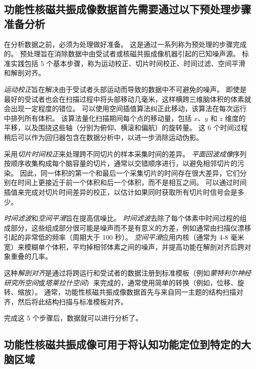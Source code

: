 


\subsection{功能性核磁共振成像数据首先需要通过以下预处理步骤准备分析}

在分析数据之前，必须为处理做好准备。 
这是通过一系列称为预处理的步骤完成的。 
预处理旨在消除数据中由受试者或核磁共振成像机器引起的已知噪声源。 
标准实践包括 5 个基本步骤，称为运动校正、切片时间校正、时间过滤、空间平滑和解剖对齐。


\textit{运动校正}旨在解决由于受试者头部运动而导致的数据中不可避免的噪声。
即使是最好的受试者也会在扫描过程中将头部移动几毫米，这样横跨三维脑体积的体素就会出现一定程度的错位。
可以使用空间插值算法纠正此移动，该算法在每次运行中排列所有体积。
该算法量化扫描期间每个点的移动量，包括 $x$、$y$ 和 $z$ 维度的平移，以及围绕这些轴（分别为俯仰、横滚和偏航）的旋转量。
这 6 个时间过程稍后可以作为回归器包含在数据分析中，以进一步消除运动伪影。


采用\textit{切片时间校正}来处理跨不同切片的样本采集时间的差异。
\textit{平面回波成像}序列按顺序收集构成每个脑容量的切片，通常以交错顺序进行，以避免相邻切片的污染。
因此，同一体积的第一个和最后一个采集切片的时间存在很大差异，它们分别在时间上更接近于前一个体积和后一个体积，而不是相互之间。
可以通过时间插值来完成对切片时间差异的校正，以估计如果同时获取所有切片时信号会是多少。


\textit{时间滤波}和\textit{空间平滑}旨在提高信噪比。
\textit{时间滤波}去除了每个体素中时间过程的组成部分，这些组成部分很可能是噪声而不是有意义的方差，例如通常由扫描仪漂移引起的非常低的频率（周期大于 100 秒）。
\textit{空间平滑}应用内核（通常为 4-8 毫米宽）来模糊单个体积，平均掉相邻体素之间的噪声，并提高功能在解剖对齐后跨对象重叠的几率。


这种\textit{解剖对齐}是通过将跨运行和受试者的数据注册到标准模板（例如\textit{蒙特利尔神经研究所空间}或\textit{塔莱拉什空间}）来完成的，通常使用简单的转换（例如，位移、旋转、缩放）。
通常，功能性核磁共振成像数据首先与来自同一主题的结构扫描对齐，然后将此结构扫描与标准模板对齐。


完成这 5 个步骤后，数据就可以进行分析了。



\subsection{功能性核磁共振成像可用于将认知功能定位到特定的大脑区域}

